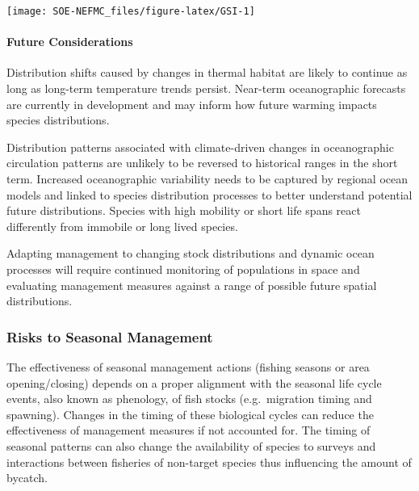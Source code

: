 \documentclass[
  10pt,
]{article}
\let\origfigure\figure
\let\endorigfigure\endfigure
\renewenvironment{figure}[1][2] {
    \expandafter\origfigure\expandafter[H]
} {
    \endorigfigure
}
\begin{document}
\begin{figure}

{\centering \texttt{[image: SOE-NEFMC\_files/figure-latex/GSI-1]} 

}

\caption{Index representing changes in the location of the Gulf Stream north wall. Positive values represent a more northerly Gulf Stream position.}\label{fig:GSI}
\end{figure}

\hypertarget{future-considerations}{%
\paragraph{Future Considerations}\label{future-considerations}}

Distribution shifts caused by changes in thermal habitat are likely to continue as long as long-term temperature trends persist. Near-term oceanographic forecasts are currently in development and may inform how future warming impacts species distributions.

Distribution patterns associated with climate-driven changes in oceanographic circulation patterns are unlikely to be reversed to historical ranges in the short term. Increased oceanographic variability needs to be captured by regional ocean models and linked to species distribution processes to better understand potential future distributions. Species with high mobility or short life spans react differently from immobile or long lived species.

Adapting management to changing stock distributions and dynamic ocean processes will require continued monitoring of populations in space and evaluating management measures against a range of possible future spatial distributions.

\hypertarget{risks-to-seasonal-management}{%
\subsubsection{Risks to Seasonal Management}\label{risks-to-seasonal-management}}

The effectiveness of seasonal management actions (fishing seasons or area opening/closing) depends on a proper alignment with the seasonal life cycle events, also known as phenology, of fish stocks (e.g.~migration timing and spawning). Changes in the timing of these biological cycles can reduce the effectiveness of management measures if not accounted for. The timing of seasonal patterns can also change the availability of species to surveys and interactions between fisheries of non-target species thus influencing the amount of bycatch.
\end{document}
